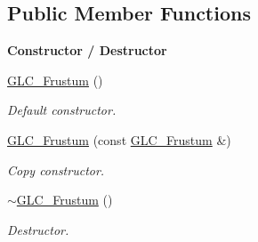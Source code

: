 \subsection*{Public Member Functions}
\begin{Indent}{\bf Constructor / Destructor}\par
\begin{DoxyCompactItemize}
\item 
\hyperlink{class_g_l_c___frustum_a85e0f6aed42fd0b8946dad7e22de6769}{G\-L\-C\-\_\-\-Frustum} ()
\begin{DoxyCompactList}\small\item\em Default constructor. \end{DoxyCompactList}\item 
\hyperlink{class_g_l_c___frustum_a16390373c340ccaae8b77910e6f6edc5}{G\-L\-C\-\_\-\-Frustum} (const \hyperlink{class_g_l_c___frustum}{G\-L\-C\-\_\-\-Frustum} \&)
\begin{DoxyCompactList}\small\item\em Copy constructor. \end{DoxyCompactList}\item 
\hyperlink{class_g_l_c___frustum_a4b603ee05df9c441a4d8cbfdf5a01f47}{$\sim$\-G\-L\-C\-\_\-\-Frustum} ()
\begin{DoxyCompactList}\small\item\em Destructor. \end{DoxyCompactList}\end{DoxyCompactItemize}
\end{Indent}
